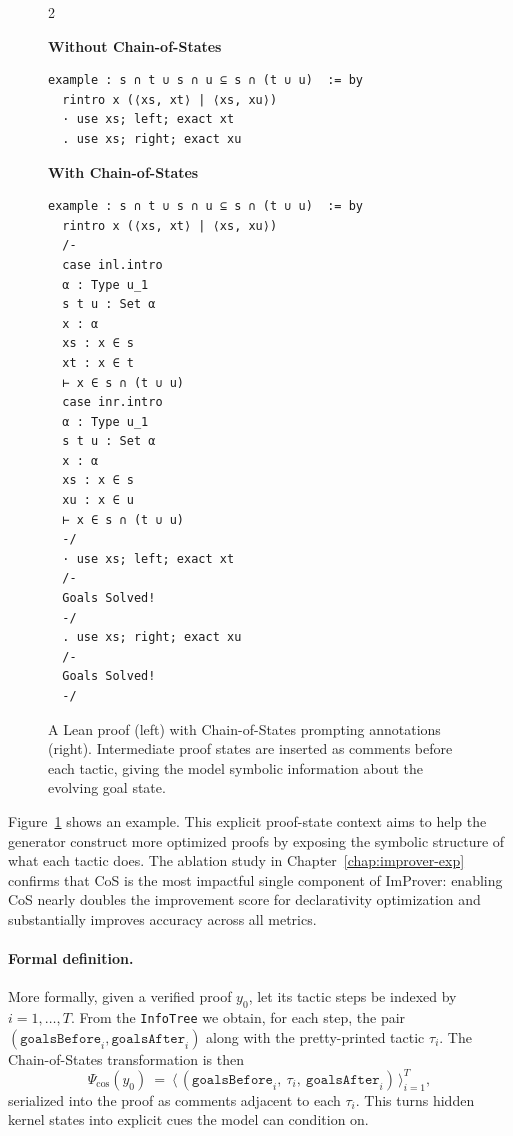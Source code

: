 \setlength{\columnsep}{0.2cm}
\begin{figure}[t!]
\begin{multicols}{2}
{
\textbf{Without Chain-of-States}
\begin{scriptsize}
\begin{lstlisting}[basicstyle=\scriptsize\ttfamily]
example : s ∩ t ∪ s ∩ u ⊆ s ∩ (t ∪ u)  := by
  rintro x (⟨xs, xt⟩ | ⟨xs, xu⟩)
  · use xs; left; exact xt
  . use xs; right; exact xu
\end{lstlisting}
\vspace{-0.8em}
\end{scriptsize}
}
\vfill\null
\columnbreak
{
\textbf{With Chain-of-States}
\begin{scriptsize}
\begin{lstlisting}[basicstyle=\scriptsize\ttfamily]
example : s ∩ t ∪ s ∩ u ⊆ s ∩ (t ∪ u)  := by
  rintro x (⟨xs, xt⟩ | ⟨xs, xu⟩)
  /-
  case inl.intro
  α : Type u_1
  s t u : Set α
  x : α
  xs : x ∈ s
  xt : x ∈ t
  ⊢ x ∈ s ∩ (t ∪ u)
  case inr.intro
  α : Type u_1
  s t u : Set α
  x : α
  xs : x ∈ s
  xu : x ∈ u
  ⊢ x ∈ s ∩ (t ∪ u)
  -/
  · use xs; left; exact xt
  /-
  Goals Solved!
  -/
  . use xs; right; exact xu
  /-
  Goals Solved!
  -/
\end{lstlisting}
\end{scriptsize}
}
\end{multicols}
\vspace{-2.5em}
\caption{A Lean proof (left) with Chain-of-States prompting annotations (right). Intermediate proof states are inserted as comments before each tactic, giving the model symbolic information about the evolving goal state.}
\label{fig:cos}
\vspace{-1em}
\end{figure}

Figure~\ref{fig:cos} shows an example. This explicit proof-state context aims to help the generator construct more optimized proofs by exposing the symbolic structure of what each tactic does. The ablation study in Chapter~\ref{chap:improver-exp} confirms that CoS is the most impactful single component of ImProver: enabling CoS nearly doubles the improvement score for declarativity optimization and substantially improves accuracy across all metrics.

\paragraph{Formal definition.}\label{def:cos}
More formally, given a verified proof $y_0$, let its tactic steps be indexed by $i=1,\dots,T$. From the \texttt{InfoTree} we obtain, for each step, the pair $(\texttt{goalsBefore}_i,\texttt{goalsAfter}_i)$ along with the pretty-printed tactic $\tau_i$. The Chain-of-States transformation is then
\[
\Psi_{\text{cos}}(y_0)\ =\ \big\langle\,(\texttt{goalsBefore}_i,\ \tau_i,\ \texttt{goalsAfter}_i)\,\big\rangle_{i=1}^T,
\]
serialized into the proof as comments adjacent to each $\tau_i$. This turns hidden kernel states into explicit cues the model can condition on.

